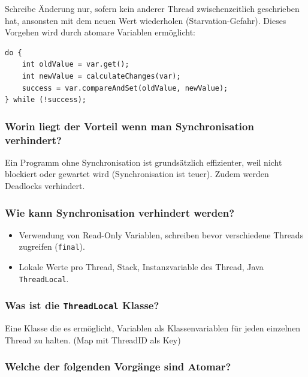 \documentclass[10pt,a4paper]{scrartcl}
\begin{document}
Schreibe Änderung nur, sofern kein anderer Thread zwischenzeitlich geschrieben hat, ansonsten mit
dem neuen Wert wiederholen (Starvation-Gefahr). Dieses Vorgehen wird durch atomare Variablen
ermöglicht:
    
\begin{verbatim}
do {
    int oldValue = var.get();
    int newValue = calculateChanges(var);
    success = var.compareAndSet(oldValue, newValue);
} while (!success);
\end{verbatim}
    
\subsubsection{Worin liegt der Vorteil wenn man Synchronisation verhindert?}

Ein Programm ohne Synchronisation ist grundsätzlich effizienter, weil nicht blockiert oder gewartet
wird (Synchronisation ist teuer). Zudem werden Deadlocks verhindert. 
  
\subsubsection{Wie kann Synchronisation verhindert werden?}

\begin{itemize}
	\item Verwendung von Read-Only Variablen, schreiben bevor verschiedene Threads zugreifen
		(\texttt{final}).
	\item Lokale Werte pro Thread, Stack, Instanzvariable des Thread, Java
		\texttt{ThreadLocal}.
\end{itemize}
  
\subsubsection{Was ist die \texttt{ThreadLocal} Klasse?}

Eine Klasse die es ermöglicht, Variablen als Klassenvariablen für jeden einzelnen Thread zu halten.
(Map mit ThreadID als Key)
  
\subsubsection{Welche der folgenden Vorgänge sind Atomar?}
\end{document}
